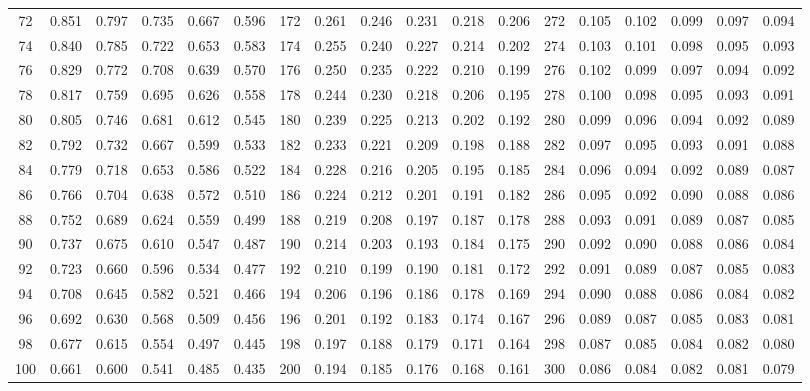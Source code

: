 \begin{table}[H]
\begin{tabular}{c|ccccc|c|ccccc|c|ccccc}
	    72      & 0.851 & 0.797 & 0.735 & 0.667 & 0.596 &     172     & 0.261 & 0.246 & 0.231 & 0.218 & 0.206 &     272     & 0.105 & 0.102 & 0.099 & 0.097 & 0.094 \\
	    74      & 0.840 & 0.785 & 0.722 & 0.653 & 0.583 &     174     & 0.255 & 0.240 & 0.227 & 0.214 & 0.202 &     274     & 0.103 & 0.101 & 0.098 & 0.095 & 0.093 \\
	    76      & 0.829 & 0.772 & 0.708 & 0.639 & 0.570 &     176     & 0.250 & 0.235 & 0.222 & 0.210 & 0.199 &     276     & 0.102 & 0.099 & 0.097 & 0.094 & 0.092 \\
	    78      & 0.817 & 0.759 & 0.695 & 0.626 & 0.558 &     178     & 0.244 & 0.230 & 0.218 & 0.206 & 0.195 &     278     & 0.100 & 0.098 & 0.095 & 0.093 & 0.091 \\
	    80      & 0.805 & 0.746 & 0.681 & 0.612 & 0.545 &     180     & 0.239 & 0.225 & 0.213 & 0.202 & 0.192 &     280     & 0.099 & 0.096 & 0.094 & 0.092 & 0.089 \\
	    82      & 0.792 & 0.732 & 0.667 & 0.599 & 0.533 &     182     & 0.233 & 0.221 & 0.209 & 0.198 & 0.188 &     282     & 0.097 & 0.095 & 0.093 & 0.091 & 0.088 \\
	    84      & 0.779 & 0.718 & 0.653 & 0.586 & 0.522 &     184     & 0.228 & 0.216 & 0.205 & 0.195 & 0.185 &     284     & 0.096 & 0.094 & 0.092 & 0.089 & 0.087 \\
	    86      & 0.766 & 0.704 & 0.638 & 0.572 & 0.510 &     186     & 0.224 & 0.212 & 0.201 & 0.191 & 0.182 &     286     & 0.095 & 0.092 & 0.090 & 0.088 & 0.086 \\
	    88      & 0.752 & 0.689 & 0.624 & 0.559 & 0.499 &     188     & 0.219 & 0.208 & 0.197 & 0.187 & 0.178 &     288     & 0.093 & 0.091 & 0.089 & 0.087 & 0.085 \\
	    90      & 0.737 & 0.675 & 0.610 & 0.547 & 0.487 &     190     & 0.214 & 0.203 & 0.193 & 0.184 & 0.175 &     290     & 0.092 & 0.090 & 0.088 & 0.086 & 0.084 \\
	    92      & 0.723 & 0.660 & 0.596 & 0.534 & 0.477 &     192     & 0.210 & 0.199 & 0.190 & 0.181 & 0.172 &     292     & 0.091 & 0.089 & 0.087 & 0.085 & 0.083 \\
	    94      & 0.708 & 0.645 & 0.582 & 0.521 & 0.466 &     194     & 0.206 & 0.196 & 0.186 & 0.178 & 0.169 &     294     & 0.090 & 0.088 & 0.086 & 0.084 & 0.082 \\
	    96      & 0.692 & 0.630 & 0.568 & 0.509 & 0.456 &     196     & 0.201 & 0.192 & 0.183 & 0.174 & 0.167 &     296     & 0.089 & 0.087 & 0.085 & 0.083 & 0.081 \\
	    98      & 0.677 & 0.615 & 0.554 & 0.497 & 0.445 &     198     & 0.197 & 0.188 & 0.179 & 0.171 & 0.164 &     298     & 0.087 & 0.085 & 0.084 & 0.082 & 0.080 \\
	    100     & 0.661 & 0.600 & 0.541 & 0.485 & 0.435 &     200     & 0.194 & 0.185 & 0.176 & 0.168 & 0.161 &     300     & 0.086 & 0.084 & 0.082 & 0.081 & 0.079 \\ \bottomrule
\end{tabular}
\end{table}
